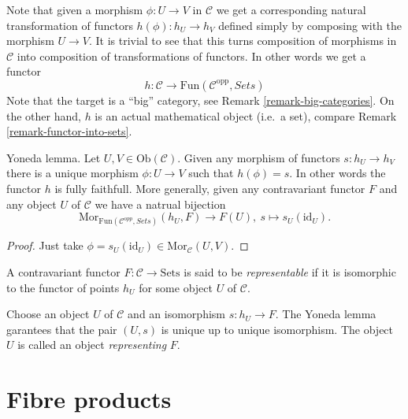 \noindent
Note that given a morphism $\phi : U \to V$ in $\mathcal{C}$ we get a
corresponding natural transformation of functors
$h(\phi) : h_U \to h_V$ defined simply by composing with the morphism
$U \to V$. It is trivial to see that this turns
composition of morphisms in $\mathcal{C}$ into composition of
transformations of functors. In other words we get a functor
$$
h :
\mathcal{C}
\longrightarrow
\text{Fun}(\mathcal{C}^{\text{opp}}, \textit{Sets})
$$
Note that the target is a ``big'' category, see
Remark \ref{remark-big-categories}. On the other hand,
$h$ is an actual mathematical object (i.e.\ a set), compare Remark
\ref{remark-functor-into-sets}.

\begin{lemma}
\label{lemma-yoneda}
Yoneda lemma.
Let $U,V \in \text{Ob}(\mathcal{C})$.
Given any morphism of functors $s : h_U \to h_V$
there is a unique morphism $\phi : U \to V$
such that $h(\phi) = s$. In other words the
functor $h$ is fully faithfull. More generally,
given any contravariant functor $F$ and any object
$U$ of $\mathcal{C}$ we have a natrual bijection
$$
\text{Mor}_{\text{Fun}(\mathcal{C}^{opp}, \textit{Sets})}(h_U, F)
\longrightarrow
F(U),\ 
s \longmapsto s_U(\text{id}_U).
$$
\end{lemma}

\begin{proof}
Just take $\phi = s_U(\text{id}_U) \in \text{Mor}_{\mathcal{C}}(U,V)$.
\end{proof}

\begin{definition}
\label{definition-representable-functor}
A contravariant functor $F : \mathcal{C}\to \text{Sets}$ is said
to be {\it representable} if it is isomorphic to the functor of
points $h_U$ for some object $U$ of $\mathcal{C}$.
\end{definition}

\noindent
Choose an object $U$ of $\mathcal{C}$ and an isomorphism $s : h_U \to F$.
The Yoneda lemma garantees that the pair $(U, s)$ 
is unique up to unique isomorphism. The object
$U$ is called an object {\it representing} $F$.

\section{Fibre products}
\label{section-fibre-products}

